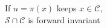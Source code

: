 \documentclass[preview]{standalone}
\begin{document}
\begin{center}
If $u = \pi(x)$ keeps $x \in \mathcal{C}$,\\$\mathcal{S} \cap \mathcal{C}$ is forward invariant
\end{center}
\end{document}
